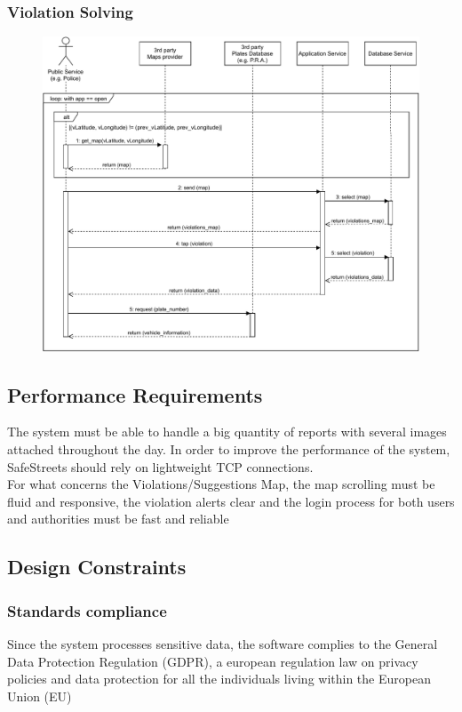 \documentclass[12pt,a4paper]{article}
\begin{document}
\subsubsection{Violation Solving}
\begin{figure}[H]
				\centering
				\includegraphics[width=1\textwidth,height=0.9\textheight,keepaspectratio]{assets/sequence_diagrams/exports/workflow_public_subject_1.pdf}
				\label{fig:workflow2_sequence}
			\end{figure}
\newpage
\subsection{Performance Requirements}
	The system must be able to handle a big quantity of reports with several images attached throughout the day. In order to improve the performance of the system, SafeStreets should rely on lightweight TCP connections.\\
	For what concerns the Violations/Suggestions Map, the map scrolling must be fluid and responsive, the violation alerts clear and the login process for both users and authorities must be fast and reliable
\subsection{Design Constraints}
\subsubsection{Standards compliance}
Since the system processes sensitive data, the software complies to the General Data Protection Regulation (GDPR), a european regulation law on privacy policies and data protection for all the individuals living within the European Union (EU)
\end{document}
